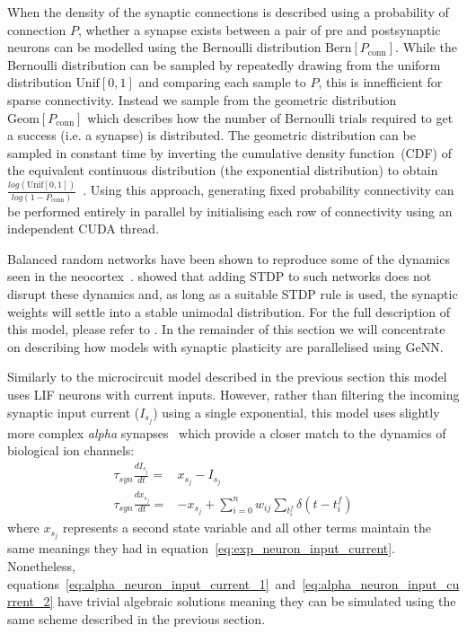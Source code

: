 \documentclass[utf8]{frontiersSCNS} %
\begin{document}
When the density of the synaptic connections is described using a probability of connection $P$, whether a synapse exists between a pair of pre and postsynaptic neurons can be modelled using the Bernoulli distribution $\text{Bern}[P_{\text{conn}}]$.
While the Bernoulli distribution can be sampled by repeatedly drawing from the uniform distribution $\text{Unif}[0, 1]$ and comparing each sample to $P$, this is innefficient for sparse connectivity.
Instead we sample from the geometric distribution $\text{Geom}[P_{\text{conn}}]$ which describes how the number of Bernoulli trials required to get a success (i.e. a synapse) is distributed.
The geometric distribution can be sampled in constant time by inverting the cumulative density function~(CDF) of the equivalent continuous distribution (the exponential distribution) to obtain $\frac{log(\text{Unif}[0, 1])}{log(1 - P_{\text{conn}})}$~\citep{DevroyeLuc2013}.
Using this approach, generating fixed probability connectivity can be performed entirely in parallel by initialising each row of connectivity using an independent CUDA thread.

Balanced random networks have been shown to reproduce some of the dynamics seen in the neocortex~\citep{Brunel1999,Brunel2000}.
\citeauthor{Morrison2007} showed that adding STDP to such networks does not disrupt these dynamics and, as long as a suitable STDP rule is used, the synaptic weights will settle into a stable unimodal distribution.
For the full description of this model, please refer to \citeauthor{Morrison2007}.
In the remainder of this section we will concentrate on describing how models with synaptic plasticity are parallelised using GeNN.

Similarly to the microcircuit model described in the previous section this model uses LIF neurons with current inputs.
However, rather than filtering the incoming synaptic input current ($I_{s_{j}}$) using a single exponential, this model uses slightly more complex \textit{alpha} synapses~\citep{Rall1967} which provide a closer match to the dynamics of biological ion channels:
%
\begin{align}
    \tau_{syn} \frac{dI_{s_{j}}}{dt} = & x_{s_{j}} - I_{s_{j}} \label{eq:alpha_neuron_input_current_1}\\ 
    \tau_{syn} \frac{dx_{s_{j}}}{dt} = & -x_{s_{j}} + \sum_{i=0}^{n} w_{ij} \sum_{t_{i}^{f}}  \delta(t - t_{i}^{f}) \label{eq:alpha_neuron_input_current_2}
\end{align}
%
where $x_{s_{j}}$ represents a second state variable and all other terms maintain the same meanings they had in equation~\ref{eq:exp_neuron_input_current}.
Nonetheless, equations~\ref{eq:alpha_neuron_input_current_1}~and~\ref{eq:alpha_neuron_input_current_2} have trivial algebraic solutions meaning they can be simulated using the same scheme described in the previous section.
\end{document}
